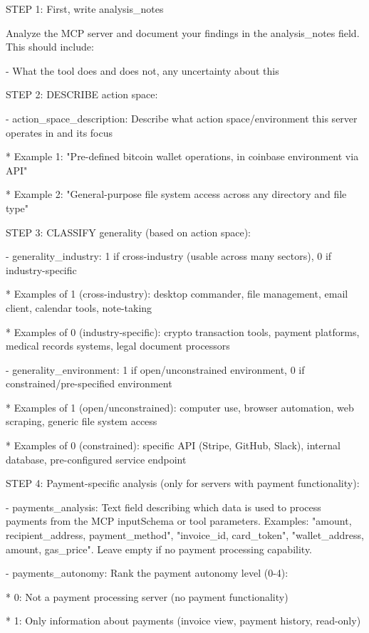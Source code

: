 \documentclass[manuscript,screen,nonacm,oneside]{acmart}
\begin{document}
STEP 1: First, write analysis\_notes

Analyze the MCP server and document your findings in the analysis\_notes field. This should include:

- What the tool does and does not, any uncertainty about this

STEP 2: DESCRIBE action space:

- action\_space\_description: Describe what action space/environment this server operates in and its focus

* Example 1: "Pre-defined bitcoin wallet operations, in coinbase environment via API"

* Example 2: "General-purpose file system access across any directory and file type"

STEP 3: CLASSIFY generality (based on action space):

- generality\_industry: 1 if cross-industry (usable across many sectors), 0 if industry-specific

* Examples of 1 (cross-industry): desktop commander, file management, email client, calendar tools, note-taking

* Examples of 0 (industry-specific): crypto transaction tools, payment platforms, medical records systems, legal document processors

- generality\_environment: 1 if open/unconstrained environment, 0 if constrained/pre-specified environment

* Examples of 1 (open/unconstrained): computer use, browser automation, web scraping, generic file system access

* Examples of 0 (constrained): specific API (Stripe, GitHub, Slack), internal database, pre-configured service endpoint

STEP 4: Payment-specific analysis (only for servers with payment functionality):

- payments\_analysis: Text field describing which data is used to process payments from the MCP inputSchema or tool parameters. Examples: "amount, recipient\_address, payment\_method", "invoice\_id, card\_token", "wallet\_address, amount, gas\_price". Leave empty if no payment processing capability.

- payments\_autonomy: Rank the payment autonomy level (0-4):

* 0: Not a payment processing server (no payment functionality)

* 1: Only information about payments (invoice view, payment history, read-only)
\end{document}
